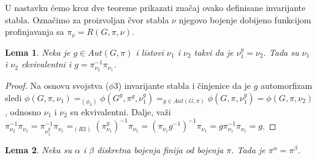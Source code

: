 \documentclass[12pt,oneside]{memoir}
\newtheorem{lemma}{Lema}
\theoremstyle{definition}
\begin{document}
  U nastavku ćemo kroz dve teoreme prikazati značaj ovako definisane
  invarijante stabla. Označimo za proizvoljan čvor stabla $\nu$ njegovo bojenje
  dobijeno funkcijom profinjavanja sa $\pi_\nu = R(G, \pi, \nu)$. 

  \begin{lemma}
	  \label{lemma:autequiv}
	  Neka je $g \in Aut(G, \pi)$ i listovi $\nu_1$ i $\nu_2$ takvi da je
	  $\nu_1^g = \nu_2$. Tada su $\nu_1$ i $\nu_2$ ekvivalentni i $g =
	  \pi_{\nu_2}^{-1}\pi_{\nu_1}$.
  \end{lemma}

  \begin{proof}
	  Na osnovu svojstva ($\phi3$) invarijante stabla i činjenice da je $g$
	  automorfizam sledi $\phi(G, \pi, \nu_1) =_{(\phi_3)} \phi(G^g, \pi^g,
	  \nu_1^g) =_{g \in Aut(G, \pi)} \phi(G, \pi, \nu_1^g) = \phi(G, \pi,
	  \nu_2)$, odnosno $\nu_1$ i $\nu_2$ su ekvivalentni. Dalje, važi
	  $\pi_{\nu_2}^{-1}\pi_{\nu_1} = \pi_{\nu_1^g}^{-1}\pi_{\nu_1} =_{(R3)}
	  (\pi_{\nu_1}^g)^{-1}\pi_{\nu_1} = (\pi_{\nu_1} g^{-1})^{-1} \pi_{\nu_1} = g
	  \pi_{\nu_1}^{-1} \pi_{\nu_1} = g$.
  \end{proof}

  \begin{lemma}
	  Neka su $\alpha$ i $\beta$ diskretna bojenja finija od bojenja $\pi$.
	  Tada je $\pi^\alpha = \pi^\beta$.
  \end{lemma}
\end{document}
